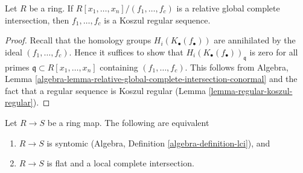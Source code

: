\begin{lemma}
\label{lemma-relative-global-complete-intersection-koszul}
Let $R$ be a ring. If $R[x_1, \ldots, x_n]/(f_1, \ldots, f_c)$
is a relative global complete intersection, then $f_1, \ldots, f_c$
is a Koszul regular sequence.
\end{lemma}

\begin{proof}
Recall that the homology groups $H_i(K_\bullet(f_\bullet))$ are
annihilated by the ideal $(f_1, \ldots, f_c)$. Hence it suffices
to show that $H_i(K_\bullet(f_\bullet))_\mathfrak q$ is zero for
all primes $\mathfrak q \subset R[x_1, \ldots, x_n]$
containing $(f_1, \ldots, f_c)$. This follows from
Algebra, Lemma
\ref{algebra-lemma-relative-global-complete-intersection-conormal}
and the fact that a regular sequence is Koszul regular
(Lemma \ref{lemma-regular-koszul-regular}).
\end{proof}

\begin{lemma}
\label{lemma-syntomic-lci}
Let $R \to S$ be a ring map. The following are equivalent
\begin{enumerate}
\item $R \to S$ is syntomic
(Algebra, Definition \ref{algebra-definition-lci}), and
\item $R \to S$ is flat and a local complete intersection.
\end{enumerate}
\end{lemma}

